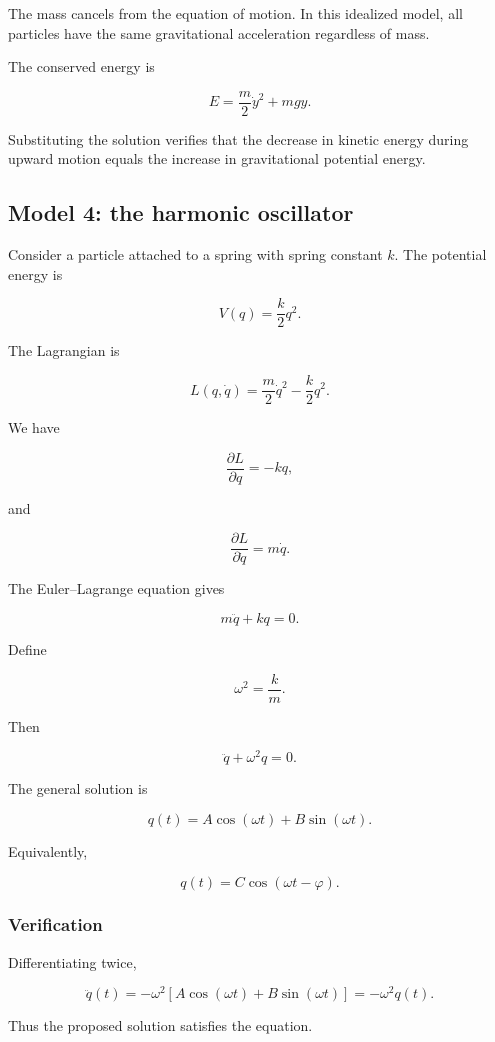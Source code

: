 The mass cancels from the equation of motion. In this idealized model, all particles have the same gravitational acceleration regardless of mass.

The conserved energy is

\[
E
=
\frac{m}{2}\dot y^{2}+mgy.
\]

Substituting the solution verifies that the decrease in kinetic energy during upward motion equals the increase in gravitational potential energy.

\subsection{Model 4: the harmonic oscillator}

Consider a particle attached to a spring with spring constant \(k\). The potential energy is

\[
V(q)
=
\frac{k}{2}q^{2}.
\]

The Lagrangian is

\[
L(q,\dot q)
=
\frac{m}{2}\dot q^{2}
-
\frac{k}{2}q^{2}.
\]

We have

\[
\frac{\partial L}{\partial q}
=
-kq,
\]

and

\[
\frac{\partial L}{\partial\dot q}
=
m\dot q.
\]

The Euler--Lagrange equation gives

\[
m\ddot q+kq=0.
\]

Define

\[
\omega^{2}
=
\frac{k}{m}.
\]

Then

\[
\boxed{
\ddot q+\omega^{2}q=0
}.
\]

The general solution is

\[
\boxed{
q(t)
=
A\cos(\omega t)
+
B\sin(\omega t)
}.
\]

Equivalently,

\[
q(t)
=
C\cos(\omega t-\varphi).
\]

\subsubsection{Verification}

Differentiating twice,

\[
\ddot q(t)
=
-\omega^{2}
\left[
A\cos(\omega t)
+
B\sin(\omega t)
\right]
=
-\omega^{2}q(t).
\]

Thus the proposed solution satisfies the equation.

